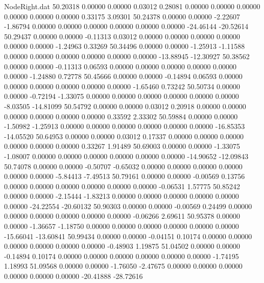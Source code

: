 \begin{filecontents}{NodeRight.dat}
  50.20318    0.00000    0.00000     0.03012    0.28081    0.00000    0.00000    0.00000    0.00000    0.00000    0.00000    0.33175    3.09301
  50.24378    0.00000    0.00000    -2.22607   -1.86794    0.00000    0.00000    0.00000    0.00000    0.00000    0.00000  -24.46144  -20.52614
  50.29437    0.00000    0.00000    -0.11313    0.03012    0.00000    0.00000    0.00000    0.00000    0.00000    0.00000   -1.24963    0.33269
  50.34496    0.00000    0.00000    -1.25913   -1.11588    0.00000    0.00000    0.00000    0.00000    0.00000    0.00000  -13.88945  -12.30927
  50.38562    0.00000    0.00000    -0.11313    0.06593    0.00000    0.00000    0.00000    0.00000    0.00000    0.00000   -1.24880    0.72778
  50.45666    0.00000    0.00000    -0.14894    0.06593    0.00000    0.00000    0.00000    0.00000    0.00000    0.00000   -1.65460    0.73242
  50.50734    0.00000    0.00000    -0.72194   -1.33075    0.00000    0.00000    0.00000    0.00000    0.00000    0.00000   -8.03505  -14.81099
  50.54792    0.00000    0.00000     0.03012    0.20918    0.00000    0.00000    0.00000    0.00000    0.00000    0.00000    0.33592    2.33302
  50.59884    0.00000    0.00000    -1.50982   -1.25913    0.00000    0.00000    0.00000    0.00000    0.00000    0.00000  -16.85353  -14.05520
  50.64953    0.00000    0.00000     0.03012    0.17337    0.00000    0.00000    0.00000    0.00000    0.00000    0.00000    0.33267    1.91489
  50.69003    0.00000    0.00000    -1.33075   -1.08007    0.00000    0.00000    0.00000    0.00000    0.00000    0.00000  -14.90652  -12.09843
  50.74078    0.00000    0.00000    -0.50707   -0.65032    0.00000    0.00000    0.00000    0.00000    0.00000    0.00000   -5.84413   -7.49513
  50.79161    0.00000    0.00000    -0.00569    0.13756    0.00000    0.00000    0.00000    0.00000    0.00000    0.00000   -0.06531    1.57775
  50.85242    0.00000    0.00000    -2.15444   -1.83213    0.00000    0.00000    0.00000    0.00000    0.00000    0.00000  -24.22554  -20.60132
  50.90303    0.00000    0.00000    -0.00569    0.24499    0.00000    0.00000    0.00000    0.00000    0.00000    0.00000   -0.06266    2.69611
  50.95378    0.00000    0.00000    -1.36657   -1.18750    0.00000    0.00000    0.00000    0.00000    0.00000    0.00000  -15.66041  -13.60841
  50.99434    0.00000    0.00000    -0.04151    0.10174    0.00000    0.00000    0.00000    0.00000    0.00000    0.00000   -0.48903    1.19875
  51.04502    0.00000    0.00000    -0.14894    0.10174    0.00000    0.00000    0.00000    0.00000    0.00000    0.00000   -1.74195    1.18993
  51.09568    0.00000    0.00000    -1.76050   -2.47675    0.00000    0.00000    0.00000    0.00000    0.00000    0.00000  -20.41888  -28.72616

\end{filecontents}
